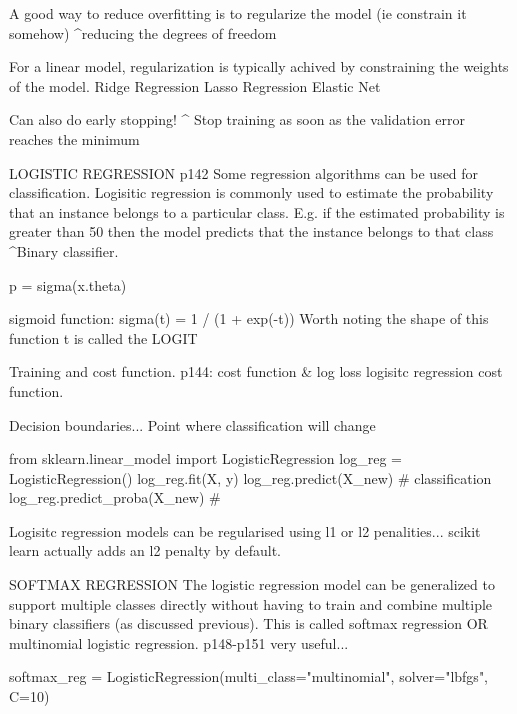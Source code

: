 A good way to reduce overfitting is to regularize the model (ie constrain it somehow)
^reducing the degrees of freedom

For a linear model, regularization is typically achived by constraining the weights of the model.
Ridge Regression
Lasso Regression
Elastic Net

Can also do early stopping!
^ Stop training as soon as the validation error reaches the minimum

LOGISTIC REGRESSION p142
Some regression algorithms can be used for classification.
Logisitic regression is commonly used to estimate the probability that
an instance belongs to a particular class.
E.g. if the estimated probability is greater than 50%
then the model predicts that the instance belongs to that class
^Binary classifier.

p = sigma(x.theta)

sigmoid function:
sigma(t) = 1 / (1 + exp(-t))
Worth noting the shape of this function
t is called the LOGIT

Training and cost function.
p144: cost function & log loss logisitc regression cost function.

Decision boundaries...
Point where classification will change

from sklearn.linear_model import LogisticRegression
log_reg = LogisticRegression()
log_reg.fit(X, y)
log_reg.predict(X_new) # classification
log_reg.predict_proba(X_new) # 

Logisitc regression models can be regularised using l1 or l2 penalities...
scikit learn actually adds an l2 penalty by default.

SOFTMAX REGRESSION
The logistic regression model can be generalized to support multiple classes directly
without having to train and combine multiple binary classifiers (as discussed previous).
This is called softmax regression OR multinomial logistic regression.
p148-p151 very useful...

softmax_reg = LogisticRegression(multi_class="multinomial", solver="lbfgs", C=10)



\newpage
